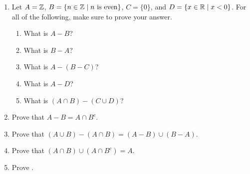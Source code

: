 \probsec{~\ref{sec:compl-set-diff}}
\begin{enumerate}
    \item Let $A = \mathbb{Z}$, $B = \{n \in \mathbb{Z} \mid n \text{ is even}\}$, $C = \{0\}$, and $D = \{x \in \mathbb{R} \mid x <0\}$. For all of the following, make sure to prove your answer.
  \begin{enumerate}
      \item What is $A - B$?
      \item What is $B - A$?
      \item What is $A - (B - C)$?
      \item What is $A - D$?
      \item What is $(A \cap B) - (C \cup D)$?
  \end{enumerate}

    \item Prove that $A - B = A \cap B^c$.

    \item Prove that $(A \cup B) - (A \cap B) = (A - B) \cup (B - A)$.

    \item Prove that $(A \cap B) \cup (A \cap B^c) = A$.

    \item Prove .
\end{enumerate}
